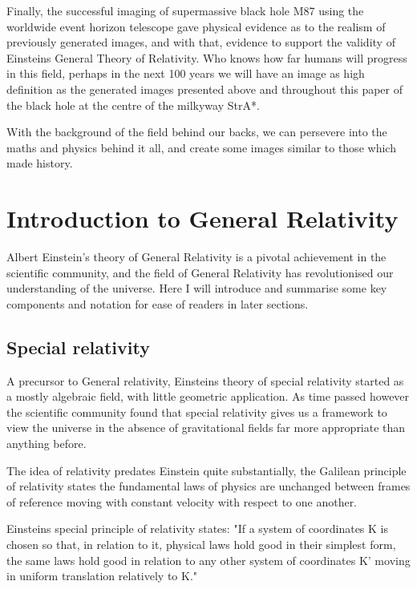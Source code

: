 \documentclass[oneside,openright,frontopenright, singlespacing]{dmathesis}
\begin{document}
\vspace{1em}
	Finally, the successful imaging of supermassive black hole M87 using the worldwide event horizon telescope gave physical evidence as to the realism of previously generated images, and with that, evidence to support the validity of Einsteins General Theory of Relativity. Who knows how far humans will progress in this field, perhaps in the next 100 years we will have an image as high definition as the generated images presented above and throughout this paper of the black hole at the centre of the milkyway StrA*.

\vspace{1em}
	With the background of the field behind our backs, we can persevere into the maths and physics behind it all, and create some images similar to those which made history.


\chapter{Introduction to General Relativity}
	Albert Einstein’s theory of General Relativity is a pivotal achievement in the scientific community, and the field of General Relativity has revolutionised our understanding of the universe. Here I will introduce and summarise some key components and notation for ease of readers in later sections.

\section{Special relativity}

	A precursor to General relativity, Einsteins theory of special relativity started as a mostly algebraic field, with little geometric application. As time passed however the scientific community found that special relativity gives us a framework to view the universe in the absence of gravitational fields far more appropriate than anything before.

\vspace{1em}
	The idea of relativity predates Einstein quite substantially, the Galilean principle of relativity states the fundamental laws of physics are unchanged between frames of reference moving with constant velocity with respect to one another.

\vspace{1em}
	Einsteins special principle of relativity states\cite{}: "If a system of coordinates K is chosen so that, in relation to it, physical laws hold good in their simplest form, the same laws hold good in relation to any other system of coordinates K' moving in uniform translation relatively to K."
\end{document}
